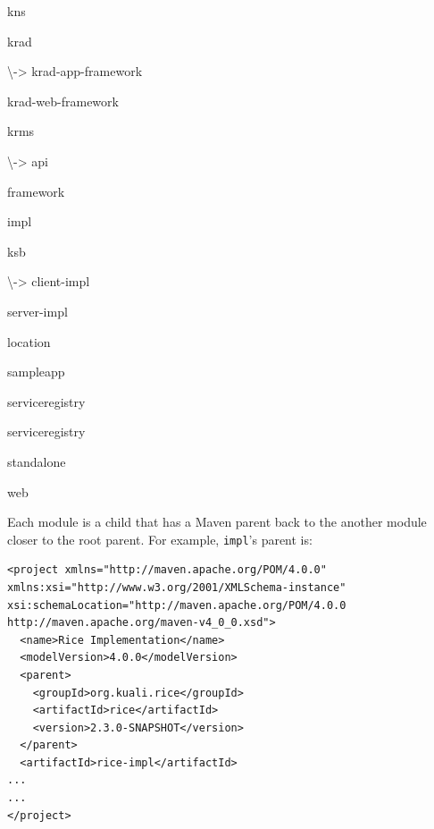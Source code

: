 \documentclass[12pt,notitlepage]{article}
\begin{document}
{\begin{list}{|->}{\setlength{\leftmargin}{1em}}
\begin{list}{|->}{\setlength{\leftmargin}{1em}}
  \item kns
  \item krad
    \begin{list}{|->}{\setlength{\leftmargin}{0.5em}}
    \item[\textbackslash->] krad-app-framework
    \item krad-web-framework
    \end{list}
  \item krms
    \begin{list}{|->}{\setlength{\leftmargin}{0.5em}}
    \item[\textbackslash->] api
    \item framework
    \item impl
    \end{list}
  \item ksb
    \begin{list}{|->}{\setlength{\leftmargin}{0.5em}}
    \item[\textbackslash->] client-impl
    \item server-impl
    \end{list} 
  \item location
  \item sampleapp
  \item serviceregistry
  \item serviceregistry
  \item standalone
  \item web
  \end{list}
\end{list}}

Each module is a child that has a Maven parent back to the another module closer to the root parent. For example, \texttt{impl}'s parent is:
  \begin{verbatim}
<project xmlns="http://maven.apache.org/POM/4.0.0" xmlns:xsi="http://www.w3.org/2001/XMLSchema-instance" xsi:schemaLocation="http://maven.apache.org/POM/4.0.0 http://maven.apache.org/maven-v4_0_0.xsd">
  <name>Rice Implementation</name>
  <modelVersion>4.0.0</modelVersion>
  <parent>
    <groupId>org.kuali.rice</groupId>
    <artifactId>rice</artifactId>
    <version>2.3.0-SNAPSHOT</version>
  </parent>
  <artifactId>rice-impl</artifactId>
...
...
</project>
  \end{verbatim}
\end{document}
